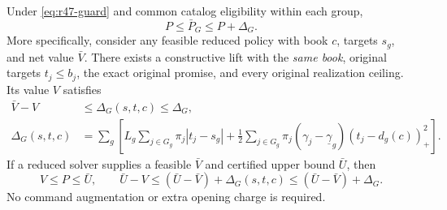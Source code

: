 \begin{theorem}\label{thm:r47-coarsening}
Under \eqref{eq:r47-guard} and common catalog eligibility within each group,
\begin{equation}\label{eq:r47-optgap}
 P\leq\bar P_G\leq P+\Delta_G.
\end{equation}
More specifically, consider any feasible reduced policy with book $c$, targets $s_g$, and net value $\bar V$. There exists a constructive lift with the \emph{same book}, original targets $t_j\leq b_j$, the exact original promise, and every original realization ceiling. Its value $V$ satisfies
\begin{align}
 \bar V-V&\leq\Delta_G(s,t,c)\leq\Delta_G,\label{eq:r47-post}\\
 \Delta_G(s,t,c)&=\sum_g\left[L_g\sum_{j\in G_g}\pi_j|t_j-s_g|
  +\frac12\sum_{j\in G_g}\pi_j(\gamma_j-\underline\gamma_g)(t_j-d_g(c))_+^2\right].\nonumber
\end{align}
If a reduced solver supplies a feasible $\bar V$ and certified upper bound $\bar U$, then
\begin{equation}\label{eq:r47-certificate}
 V\leq P\leq\bar U,\qquad
 \bar U-V\leq(\bar U-\bar V)+\Delta_G(s,t,c)
              \leq(\bar U-\bar V)+\Delta_G.
\end{equation}
No command augmentation or extra opening charge is required.
\end{theorem}
